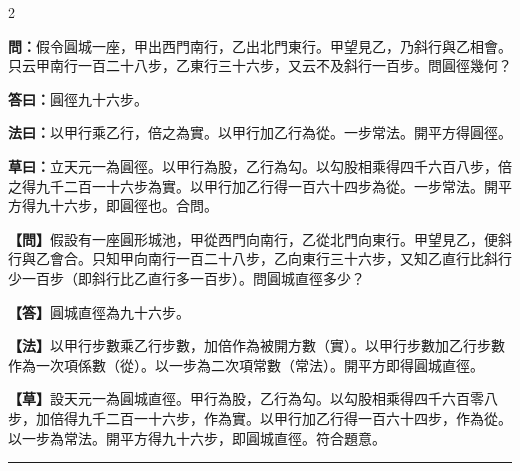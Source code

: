 \documentclass[11pt,a4paper]{article}
\newcommand{\longline}{\noindent\rule{\textwidth}{0.4pt}}
\newcommand{\wenC}[1]{\par\noindent\textbf{\textcolor{probcolor}{問：}}{#1}\par}
\newcommand{\daC}[1]{\par\noindent\textbf{\textcolor{anscolor}{答曰：}}{#1}\par}
\newcommand{\fayueC}[1]{\par\noindent\textbf{\textcolor{methodcolor}{法曰：}}{#1}\par}
\newcommand{\caoyueC}[1]{\par\noindent\textbf{草曰：}{#1}\par}
\newcommand{\wenM}[1]{\par\noindent\textbf{\textcolor{probcolor}{【問】}}{#1}\par}
\newcommand{\daM}[1]{\par\noindent\textbf{\textcolor{anscolor}{【答】}}{#1}\par}
\newcommand{\fayueM}[1]{\par\noindent\textbf{\textcolor{methodcolor}{【法】}}{#1}\par}
\newcommand{\caoyueM}[1]{\par\noindent\textbf{【草】}{#1}\par}
\begin{document}
\begin{paracol}{2}

\wenC{假令圓城一座，甲出西門南行，乙出北門東行。甲望見乙，乃斜行與乙相會。只云甲南行一百二十八步，乙東行三十六步，又云不及斜行一百步。問圓徑幾何？}

\daC{圓徑九十六步。}

\fayueC{以甲行乘乙行，倍之為實。以甲行加乙行為從。一步常法。開平方得圓徑。}

\caoyueC{立天元一為圓徑。以甲行為股，乙行為勾。以勾股相乘得四千六百八步，倍之得九千二百一十六步為實。以甲行加乙行得一百六十四步為從。一步常法。開平方得九十六步，即圓徑也。合問。}

\switchcolumn

\wenM{假設有一座圓形城池，甲從西門向南行，乙從北門向東行。甲望見乙，便斜行與乙會合。只知甲向南行一百二十八步，乙向東行三十六步，又知乙直行比斜行少一百步（即斜行比乙直行多一百步）。問圓城直徑多少？}

\daM{圓城直徑為九十六步。}

\fayueM{以甲行步數乘乙行步數，加倍作為被開方數（實）。以甲行步數加乙行步數作為一次項係數（從）。以一步為二次項常數（常法）。開平方即得圓城直徑。}

\caoyueM{設天元一為圓城直徑。甲行為股，乙行為勾。以勾股相乘得四千六百零八步，加倍得九千二百一十六步，作為實。以甲行加乙行得一百六十四步，作為從。以一步為常法。開平方得九十六步，即圓城直徑。符合題意。}

\end{paracol}

\vspace{0.3cm}
\longline
\end{document}

